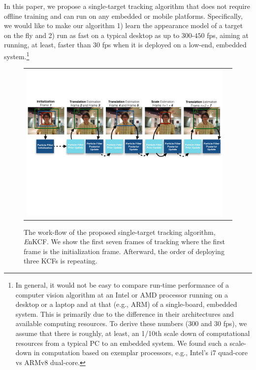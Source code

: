 \documentclass[10pt,twocolumn,letterpaper]{article}
\begin{document}
In this paper, we propose a single-target tracking algorithm that does
not require offline training and can run on any embedded or mobile
platforms. Specifically, we would like to make our algorithm 1) learn
the appearance model of a target on the fly and 2) run as fast on a
typical desktop as up to $300$-$450$ fps, aiming at running, at least,
faster than 30 fps when it is deployed on a low-end, embedded
system.\footnote{In general, it would not be easy to compare run-time
  performance of a computer vision algorithm at an Intel or AMD
  processor running on a desktop or a laptop and at that (e.g., ARM)
  of a single-board, embedded system. This is primarily due to the
  difference in their architectures and available computing
  resources. To derive these numbers (300 and 30 fps), we assume that
  there is roughly, at least, an 1/10th scale down of computational
  resources from a typical PC to an embedded system. We found such a
  scale-down in computation based on exemplar processors, e.g.,
  Intel's i7 quad-core vs ARMv8 dual-core.}

\begin{figure}[!h]
\centering
\begin{tabular}{cc}
\includegraphics[width=14.00cm]{./figures/Workflow_MKCF+PF.pdf}\\
\end{tabular}
\caption{The work-flow of the proposed single-target tracking
  algorithm, {\it E}nKCF. We show the first seven frames of tracking
  where the first frame is the initialization frame. Afterward, the
  order of deploying three KCFs is repeating.}
\label{Workflows}
\end{figure}
\end{document}
